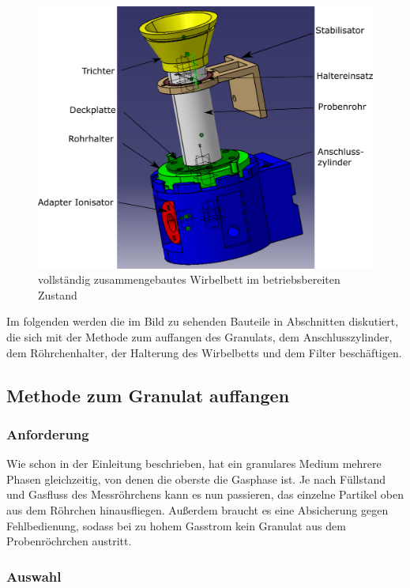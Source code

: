 \begin{figure}[h]
	\begin{center}
		\includegraphics[scale=0.4]{Zusammenbau_fluides_Bett.png}
		\caption[Modell Wirbelbett]{vollständig zusammengebautes Wirbelbett im betriebsbereiten Zustand}
	\end{center}
\end{figure}


Im folgenden werden die im Bild zu sehenden Bauteile in Abschnitten diskutiert, die sich mit der Methode zum auffangen des Granulats, dem Anschlusszylinder, dem Röhrchenhalter, der Halterung des Wirbelbetts und dem Filter beschäftigen.


\subsection{Methode zum Granulat auffangen}

\subsubsection{Anforderung}

Wie schon in der Einleitung beschrieben, hat ein granulares Medium mehrere Phasen gleichzeitig, von denen die oberste die Gasphase ist. Je nach Füllstand und Gasfluss des Messröhrchens kann es nun passieren, das einzelne Partikel oben aus dem Röhrchen hinausfliegen. Außerdem braucht es eine Absicherung gegen Fehlbedienung, sodass bei zu hohem Gasstrom kein Granulat aus dem Probenröchrchen austritt.

\subsubsection{Auswahl}

